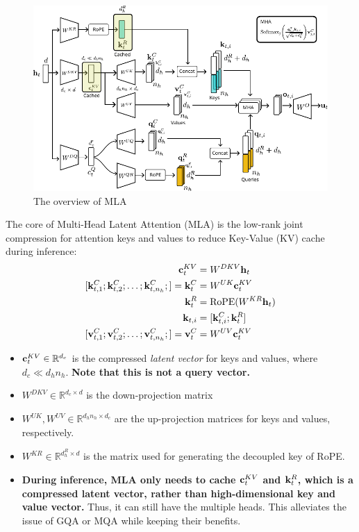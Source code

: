 \begin{figure}[h]
	\centering
	\includegraphics[scale=1.1]{./images/transformer/mla.pdf}
	\caption{The overview of MLA}
\end{figure}
The core of Multi-Head Latent Attention (MLA) is the low-rank joint compression for attention keys and values to reduce Key-Value (KV) cache during inference:
\begin{align*}
	\rvc_t^{KV} &= W^{DKV}\rvh_t\\
	[\rvk_{t,1}^C; \rvk_{t,2}^C; \dots ;\rvk_{t,n_h}^C;] = \rvk_t^{C} &= W^{UK}\rvc_t^{KV}\\
	\rvk_t^{R} &= \text{RoPE}(W^{KR}\rvh_t)\\
	\rvk_{t,i} &= [\rvk_{t,i}^C;\rvk_t^{R}]\\
	[\rvv_{t,1}^C; \rvv_{t,2}^C; \dots ;\rvv_{t,n_h}^C;] = \rvv_t^{C} &= W^{UV}\rvc_t^{KV}
\end{align*}
\begin{itemize}
	\item ${\mathbf{c}}_t^{KV}\in \mathbb{R}^{d_c}$ is the compressed \textit{latent vector} for keys and values, where $d_c\ll d_hn_h$. \textbf{Note that this is not a query vector.}
	\item $W^{DKV}\in \mathbb{R}^{d_c\times d}$ is the down-projection matrix
	\item $W^{UK},W^{UV}\in \mathbb{R}^{d_hn_h\times d_c}$ are the up-projection matrices for keys and values, respectively.
	\item $W^{KR}\in \mathbb{R}^{d_h^R\times d}$ is the matrix used for generating the decoupled key of RoPE. 
	\item \textbf{During inference, MLA only needs to cache ${\mathbf{c}}_t^{KV}$ and ${\mathbf{k}}_t^{R}$, which is a compressed latent vector, rather than high-dimensional key and value vector.} Thus, it can still have the multiple heads. This alleviates the issue of GQA or MQA while keeping their benefits. 
\end{itemize}
